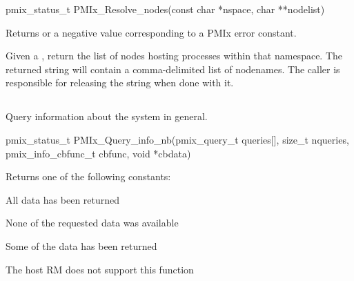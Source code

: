 \cspecificstart
\begin{codepar}
pmix_status_t
PMIx_Resolve_nodes(const char *nspace, char **nodelist)
\end{codepar}
\cspecificend

\begin{arglist}
\end{arglist}

Returns  or a negative value corresponding to a PMIx error constant.

\descr

Given a , return the list of nodes hosting processes within that namespace.
The returned string will contain a comma-delimited list of nodenames.
The caller is responsible for releasing the string when done with it.


\subsection{}

\summary

Query information about the system in general.

\format

\cspecificstart
\begin{codepar}
pmix_status_t
PMIx_Query_info_nb(pmix_query_t queries[], size_t nqueries,
                   pmix_info_cbfunc_t cbfunc, void *cbdata)
\end{codepar}
\cspecificend

\begin{arglist}
\end{arglist}

Returns one of the following constants:

\begin{constantdesc}
\item {} All data has been returned
\item {} None of the requested data was available
\item {} Some of the data has been returned
\item {} The host \ac{RM} does not support this function
\end{constantdesc}

